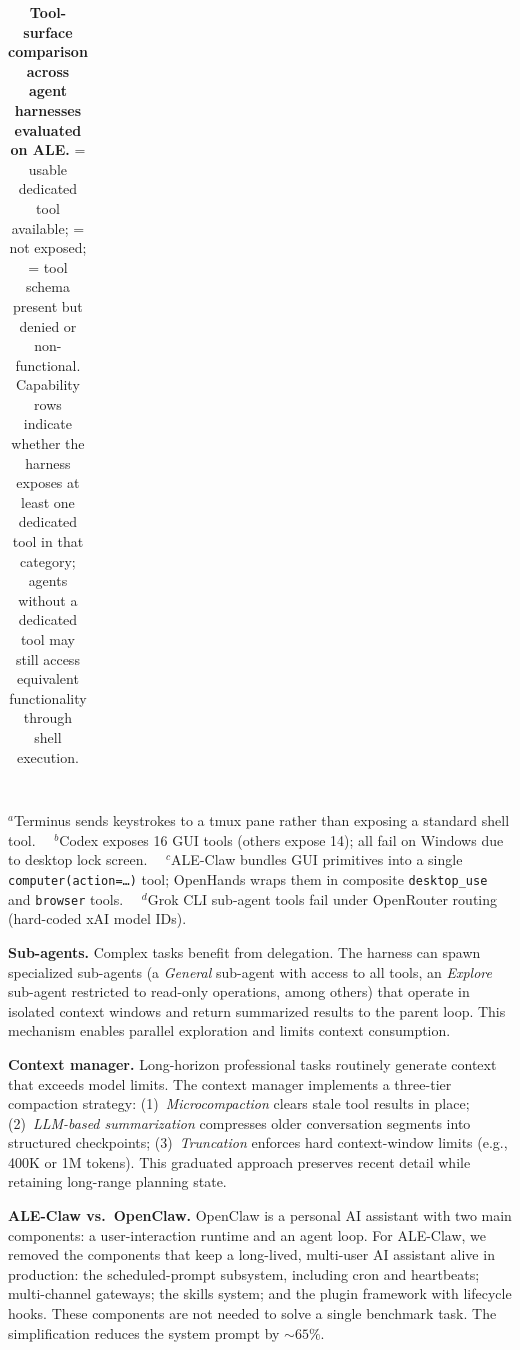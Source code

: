 \documentclass{llmxive}
\providecommand{\cmark}{\ding{51}}
\providecommand{\xmark}{\ding{55}}
\begin{document}
\begin{table}[!htbp]
\begin{tabular}{@{}l *{11}{c} @{}}
\bottomrule
\end{tabular}
\\[4pt]
\scriptsize
$^a$Terminus sends keystrokes to a tmux pane rather than exposing a standard shell tool.~~
$^b$Codex exposes 16 GUI tools (others expose 14); all fail on Windows due to desktop lock screen.~~
$^c$ALE-Claw bundles GUI primitives into a single \texttt{computer(action=\dots)} tool; OpenHands wraps them in composite \texttt{desktop\_use} and \texttt{browser} tools.~~
$^d$Grok CLI sub-agent tools fail under OpenRouter routing (hard-coded xAI model IDs).
\caption{\textbf{Tool-surface comparison across agent harnesses evaluated on ALE.}
\cmark{} = usable dedicated tool available;
\textendash{} = not exposed;
\xmark{} = tool schema present but denied or non-functional.
Capability rows indicate whether the harness exposes at least one dedicated tool in that category;
agents without a dedicated tool may still access equivalent functionality through shell execution.}
\label{tab:tool-surface}
\end{table}
\fi

\noindent \textbf{Sub-agents.}
Complex tasks benefit from delegation. The harness can spawn specialized sub-agents (a \emph{General} sub-agent with access to all tools, an \emph{Explore} sub-agent restricted to read-only operations, among others) that operate in isolated context windows and return summarized results to the parent loop. This mechanism enables parallel exploration and limits context consumption.

\noindent \textbf{Context manager.}
Long-horizon professional tasks routinely generate context that exceeds model limits. The context manager implements a three-tier compaction strategy: (1)~\emph{Microcompaction} clears stale tool results in place; (2)~\emph{LLM-based summarization} compresses older conversation segments into structured checkpoints; (3)~\emph{Truncation} enforces hard context-window limits (e.g., 400K or 1M tokens). This graduated approach preserves recent detail while retaining long-range planning state.

\noindent \textbf{ALE-Claw vs.\ OpenClaw.}
OpenClaw is a personal AI assistant with two main components: a user-interaction runtime and an agent loop.
For ALE-Claw, we removed the components that keep a long-lived, multi-user AI assistant alive in production: the scheduled-prompt subsystem, including cron and heartbeats; multi-channel gateways; the skills system; and the plugin framework with lifecycle hooks.
These components are not needed to solve a single benchmark task.
The simplification reduces the system prompt by ${\sim}65\%$.
\end{document}
